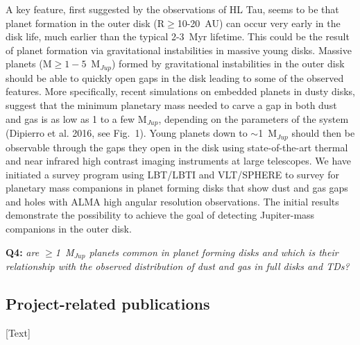 \documentclass[10pt,fleqn,twoside]{article}
\newcommand{\Tcol}{\color{blue}}
\begin{document}
A key feature, first suggested by the observations of HL Tau, seems to be that planet formation in the outer disk (R$\ge$10-20~AU) can occur very early in the disk life, much earlier than the typical 2-3~Myr lifetime. This could be the result of planet formation via gravitational instabilities in massive young disks. Massive planets (M$\ge 1-5$~M$_{Jup}$) formed by gravitational instabilities in the outer disk should be able to quickly open gaps in the disk leading to some of the observed features. More specifically, recent simulations on embedded planets in dusty disks, suggest that the minimum planetary mass needed to carve a gap in both dust and gas is as low as 1 to a few M$_{Jup}$, depending on the parameters of the system (Dipierro et al. 2016, see Fig.~1). Young planets down to $\sim$1~M$_{Jup}$ should then be observable through the gaps they open in the disk using state-of-the-art thermal and near infrared high contrast imaging instruments at large telescopes. We have initiated a survey program using LBT/LBTI and VLT/SPHERE to survey for planetary mass companions in planet forming disks that show dust and gas gaps and holes with ALMA high angular resolution observations. The initial results demonstrate the possibility to achieve the goal of detecting Jupiter-mass companions in the outer disk.

\smallskip
{\bf Q4:} {\it are $\ge$1~M$_{Jup}$ planets common in planet forming disks and which is their relationship with the observed distribution of dust and gas in full disks and TDs?}

\subsection{\Tcol Project-related publications}

[Text]
\end{document}
